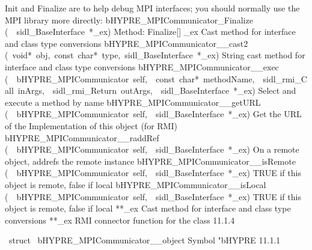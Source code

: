 \documentclass{article}
\begin{document}
\begin{cxxentry}
\begin{cxxentry}
\begin{cxxnames}
        {
Init and Finalize are to help debug MPI interfaces;
you should normally use the MPI library more directly:}
        {}
\label{cxx.11.1.11}
        {bHYPRE\_MPICommunicator\_Finalize}
        {(\ \ sidl\_BaseInterface\ *\_ex)}
        {
Method:  Finalize[]}
        {}
\label{cxx.11.1.12}
        {\_ex}
        {}
        {
Cast method for interface and class type conversions}
        {}
\label{cxx.11.1.13}
        {bHYPRE\_MPICommunicator\_\_cast2}
        {(\ void*\ obj,\ const\ char*\ type,\ sidl\_BaseInterface\ *\_ex)}
        {
String cast method for interface and class type conversions}
        {}
\label{cxx.11.1.14}
        {bHYPRE\_MPICommunicator\_\_exec}
        {(\ \ bHYPRE\_MPICommunicator\ self,\ \ const\ char*\ methodName,\ \ sidl\_rmi\_Call\ inArgs,\ \ sidl\_rmi\_Return\ outArgs,\ \ sidl\_BaseInterface\ *\_ex)}
        {
Select and execute a method by name}
        {}
\label{cxx.11.1.15}
        {bHYPRE\_MPICommunicator\_\_getURL}
        {(\ \ bHYPRE\_MPICommunicator\ self,\ \ sidl\_BaseInterface\ *\_ex)}
        {
Get the URL of the Implementation of this object (for RMI)}
        {}
\label{cxx.11.1.16}
        {bHYPRE\_MPICommunicator\_\_raddRef}
        {(\ \ bHYPRE\_MPICommunicator\ self,\ \ sidl\_BaseInterface\ *\_ex)}
        {
On a remote object, addrefs the remote instance}
        {}
\label{cxx.11.1.17}
        {bHYPRE\_MPICommunicator\_\_isRemote}
        {(\ \ bHYPRE\_MPICommunicator\ self,\ \ sidl\_BaseInterface\ *\_ex)}
        {
TRUE if this object is remote, false if local}
        {}
\label{cxx.11.1.18}
        {bHYPRE\_MPICommunicator\_\_isLocal}
        {(\ \ bHYPRE\_MPICommunicator\ self,\ \ sidl\_BaseInterface\ *\_ex)}
        {
TRUE if this object is remote, false if local}
        {}
\label{cxx.11.1.19}
        {**\_ex}
        {}
        {
Cast method for interface and class type conversions}
        {}
\label{cxx.11.1.20}
        {**\_ex}
        {}
        {
RMI connector function for the class}
        {11.1.4}
\end{cxxnames}
\begin{cxxvariable}
{\ struct\ }
        {bHYPRE\_MPICommunicator\_\_object}
        {}
        {
Symbol "bHYPRE}
        {11.1.1}
\begin{cxxdoc}


\end{cxxdoc}
\end{cxxvariable}
\end{cxxentry}
\end{cxxentry}
\end{document}

